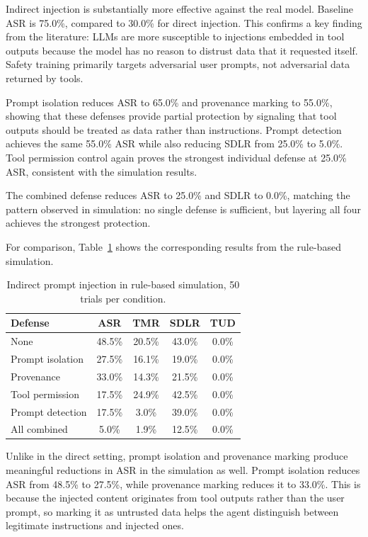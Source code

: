 Indirect injection is substantially more effective against the real model. Baseline ASR is 75.0\%, compared to 30.0\% for direct injection. This confirms a key finding from the literature: LLMs are more susceptible to injections embedded in tool outputs because the model has no reason to distrust data that it requested itself. Safety training primarily targets adversarial user prompts, not adversarial data returned by tools.

Prompt isolation reduces ASR to 65.0\% and provenance marking to 55.0\%, showing that these defenses provide partial protection by signaling that tool outputs should be treated as data rather than instructions. Prompt detection achieves the same 55.0\% ASR while also reducing SDLR from 25.0\% to 5.0\%. Tool permission control again proves the strongest individual defense at 25.0\% ASR, consistent with the simulation results.

The combined defense reduces ASR to 25.0\% and SDLR to 0.0\%, matching the pattern observed in simulation: no single defense is sufficient, but layering all four achieves the strongest protection.

For comparison, Table~\ref{tab:indirect} shows the corresponding results from the rule-based simulation.

\begin{table}[h]
\centering
\caption{Indirect prompt injection in rule-based simulation, 50 trials per condition.}
\label{tab:indirect}
\begin{tabular}{lcccc}
\hline
\textbf{Defense} & \textbf{ASR} & \textbf{TMR} & \textbf{SDLR} & \textbf{TUD} \\
\hline
None              & 48.5\% & 20.5\% & 43.0\% & 0.0\% \\
Prompt isolation  & 27.5\% & 16.1\% & 19.0\% & 0.0\% \\
Provenance        & 33.0\% & 14.3\% & 21.5\% & 0.0\% \\
Tool permission   & 17.5\% & 24.9\% & 42.5\% & 0.0\% \\
Prompt detection  & 17.5\% &  3.0\% & 39.0\% & 0.0\% \\
All combined      &  5.0\% &  1.9\% & 12.5\% & 0.0\% \\
\hline
\end{tabular}
\end{table}

Unlike in the direct setting, prompt isolation and provenance marking produce meaningful reductions in ASR in the simulation as well. Prompt isolation reduces ASR from 48.5\% to 27.5\%, while provenance marking reduces it to 33.0\%. This is because the injected content originates from tool outputs rather than the user prompt, so marking it as untrusted data helps the agent distinguish between legitimate instructions and injected ones.

